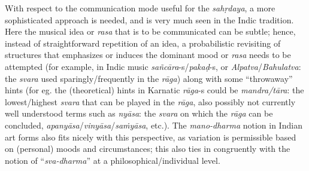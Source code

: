 With respect to the communication mode useful for the \textsl{sahṛdaya}, a more sophisticated approach is needed, and is very much seen in the Indic tradition. Here the musical idea or \textsl{rasa} that is to be communicated can be subtle; hence, instead of straightforward repetition of an idea, a probabilistic revisiting of structures that emphasizes or induces the dominant mood or \textsl{rasa} needs to be attempted (for example, in Indic music \textsl{sañcāra}-s/\textsl{pakaḍ}-s, or \textsl{Alpatva}/\textsl{Bahulatva}: the \textsl{svara} used sparingly/frequently in the \textsl{rāga}) along with some “throwaway” hints (for eg. the (theoretical) hints in Karnatic \textsl{rāga}-s could be \textsl{mandra/tāra}: the lowest/highest \textsl{svara} that can be played in the \textsl{rāga}, also possibly not currently well understood terms such as \textsl{nyāsa}: the \textsl{svara} on which the \textsl{rāga} can be concluded, \textsl{apanyāsa}/\textsl{vinyāsa}/\textsl{saṁyāsa}, etc.). The \textsl{mano-dharma} notion in Indian art forms also fits nicely with this perspective, as variation is permissible based on (personal) moods and circumstances; this also ties in congruently with the notion of “\textsl{sva-dharma}” at a philosophical/individual level.


